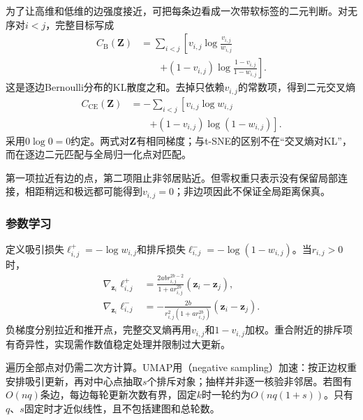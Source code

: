 为了让高维和低维的边强度接近，可把每条边看成一次带软标签的二元判断。对无序对$i<j$，完整目标写成
\begin{equation}
  \label{eq:dim-umap-bernoulli}
  \begin{aligned}
    C_{\mathrm{B}}(\bm{Z})
      &=\sum_{i<j}\left[
        v_{i,j}\log\frac{v_{i,j}}{w_{i,j}}\right.\\
      &\qquad\left.+
        (1-v_{i,j})\log\frac{1-v_{i,j}}{1-w_{i,j}}
        \right].
  \end{aligned}
\end{equation}
这是逐边Bernoulli分布的KL散度之和。去掉只依赖$v_{i,j}$的常数项，得到二元交叉熵
\begin{equation}
  \label{eq:dim-umap-cross-entropy}
  \begin{aligned}
    C_{\mathrm{CE}}(\bm{Z})
      &=-\sum_{i<j}\left[
        v_{i,j}\log w_{i,j}\right.\\
      &\qquad\left.+
        (1-v_{i,j})\log(1-w_{i,j})\right].
  \end{aligned}
\end{equation}
采用$0\log0=0$约定。两式对$\bm{Z}$有相同梯度；与t-SNE的区别不在“交叉熵对KL”，而在逐边二元匹配与全局归一化点对匹配。

第一项拉近有边的点，第二项阻止非邻居贴近。但零权重只表示没有保留局部连接，相距稍远和极远都可能得到$v_{i,j}=0$；非边项因此不保证全局距离保真。

\subsubsection{参数学习}

定义吸引损失$\ell^+_{i,j}=-\log w_{i,j}$和排斥损失$\ell^-_{i,j}=-\log(1-w_{i,j})$。当$r_{i,j}>0$时，
\begin{equation}
  \label{eq:dim-umap-pair-gradient}
  \begin{aligned}
    \nabla_{\bm{z}_i}\ell^+_{i,j}
      &=\frac{2ab r_{i,j}^{2b-2}}
        {1+a r_{i,j}^{2b}}(\bm{z}_i-\bm{z}_j),\\
    \nabla_{\bm{z}_i}\ell^-_{i,j}
      &=-\frac{2b}
        {r_{i,j}^2(1+a r_{i,j}^{2b})}
        (\bm{z}_i-\bm{z}_j).
  \end{aligned}
\end{equation}
负梯度分别拉近和推开点，完整交叉熵再用$v_{i,j}$和$1-v_{i,j}$加权。重合附近的排斥项有奇异性，实现需作数值稳定处理并限制过大更新。

遍历全部点对仍需二次方计算。UMAP用（negative sampling）加速：按正边权重安排吸引更新，再对中心点抽取$s$个排斥对象；抽样并非逐一核验非邻居。若图有$O(nq)$条边，每边每轮更新次数有界，固定$k$时一轮约为$O(nq(1+s))$。只有$q$、$s$固定时才近似线性，且不包括建图和总轮数。

